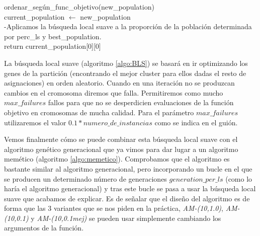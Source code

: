 \documentclass[11pt,a4paper]{article}
\begin{document}
\begin{algorithm}[H]
{{{{                        ordenar\_según\_func\_objetivo(new\_population) \\
                    }
                    current\_population $\leftarrow$ new\_population \\
                }
                -Aplicamos la búsqueda local suave a la proporción de la población determinada por perc\_ls y best\_population.\\
            }
            return current\_population[0][0]      \\
    	 	}
	\end{algorithm}
	
	
	
	La búsqueda local suave (algoritmo \ref{algo:BLS}) se basará en ir optimizando los genes de la partición (encontrando el mejor cluster para ellos dadas el resto de asignaciones) en orden aleatorio. Cuando en una iteración no se produzcan cambios en el cromosoma diremos que falla. Permitiremos como mucho $max\_failures$ fallos para que no se desperdicien evaluaciones de la función objetivo en cromosomas de mucha calidad. Para el parámetro $max\_failures$ utilizaremos el valor $0.1 * numero\_de\_instancias$ como se indica en el guión. 
	
	Vemos finalmente cómo se puede combinar esta búsqueda local suave con el algoritmo genético generacional que ya vimos para dar lugar a un algoritmo memético (algoritmo \ref{algo:memetico}). Comprobamos que el algoritmo es bastante similar al algoritmo generacional, pero incorporando un bucle en el que se producen un determinado número de generaciones $generation\_per\_ls$ (como lo haría el algoritmo generacional) y tras este bucle se pasa a usar la búsqueda local suave que acabamos de explicar. Es de señalar que el diseño del algoritmo es de forma que las 3 variantes que se nos piden en la práctica, \textit{AM-(10,1.0)}, \textit{AM-(10,0.1)} y \textit{AM-(10,0.1mej)} se pueden usar simplemente cambiando los argumentos de la función. 
	
\end{document}
